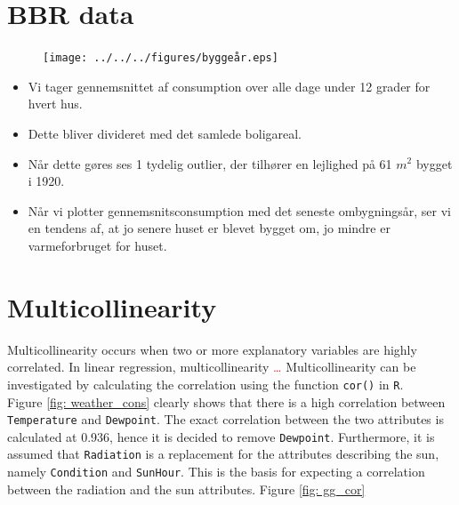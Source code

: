 \section{BBR data}

\begin{figure}
    \centering
    \texttt{[image: ../../../figures/byggeår.eps]}
    \caption{}
    \label{fig: byggeår}
\end{figure}

\begin{itemize}
    \item Vi tager gennemsnittet af consumption over alle dage under 12 grader for hvert hus.
    \item Dette bliver divideret med det samlede boligareal.
    \item Når dette gøres ses 1 tydelig outlier, der tilhører en lejlighed på 61 $m^2$ bygget i 1920.
    \item Når vi plotter gennemsnitsconsumption med det seneste ombygningsår, ser vi en tendens af, at jo senere huset er blevet bygget om, jo mindre er varmeforbruget for huset.
\end{itemize}    

\section{Multicollinearity}
Multicollinearity occurs when two or more explanatory variables are highly correlated. In linear regression, multicollinearity \textcolor{red}{\dots} Multicollinearity can be investigated by calculating the correlation using the function \texttt{cor()} in \texttt{R}.\\

\noindent Figure \ref{fig: weather_cons} clearly shows that there is a high correlation between \texttt{Temperature} and \texttt{Dewpoint}. The exact correlation between the two attributes is calculated at 0.936, hence it is decided to remove \texttt{Dewpoint}. Furthermore, it is assumed that \texttt{Radiation} is a replacement for the attributes describing the sun, namely \texttt{Condition} and \texttt{SunHour}. This is the basis for expecting a correlation between the radiation and the sun attributes. Figure \ref{fig: gg_cor} 

